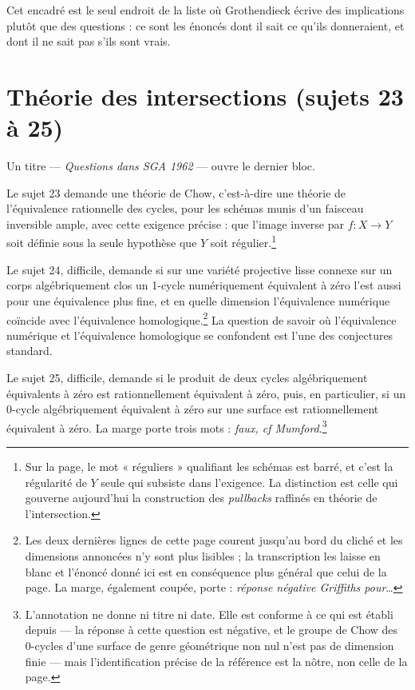 \documentclass[11pt,a4paper]{article}
\begin{document}
Cet encadré est le seul endroit de la liste où Grothendieck écrive des
implications plutôt que des questions : ce sont les énoncés dont il sait ce
qu'ils donneraient, et dont il ne sait pas s'ils sont vrais.

\section*{Théorie des intersections (sujets 23 à 25)}

Un titre --- \emph{Questions dans SGA 1962} --- ouvre le dernier bloc.

Le sujet 23 demande une théorie de Chow, c'est-à-dire une théorie de
l'équivalence rationnelle des cycles, pour les schémas munis d'un faisceau
inversible ample, avec cette exigence précise : que l'image inverse par
$f : X \to Y$ soit définie sous la seule hypothèse que $Y$ soit
régulier.\footnote{Sur la page, le mot « réguliers » qualifiant les schémas est
barré, et c'est la régularité de $Y$ seule qui subsiste dans l'exigence. La
distinction est celle qui gouverne aujourd'hui la construction des
\emph{pullbacks} raffinés en théorie de l'intersection.}

Le sujet 24, difficile, demande si sur une variété projective lisse connexe sur
un corps algébriquement clos un 1-cycle numériquement équivalent à zéro l'est
aussi pour une équivalence plus fine, et en quelle dimension l'équivalence
numérique coïncide avec l'équivalence homologique.\footnote{Les deux dernières
lignes de cette page courent jusqu'au bord du cliché et les dimensions
annoncées n'y sont plus lisibles ; la transcription les laisse en blanc et
l'énoncé donné ici est en conséquence plus général que celui de la page. La
marge, également coupée, porte : \emph{réponse négative Griffiths pour}\ldots}
La question de savoir où l'équivalence numérique et l'équivalence homologique
se confondent est l'une des conjectures standard.

Le sujet 25, difficile, demande si le produit de deux cycles algébriquement
équivalents à zéro est rationnellement équivalent à zéro, puis, en particulier,
si un 0-cycle algébriquement équivalent à zéro sur une surface est
rationnellement équivalent à zéro. La marge porte trois mots : \emph{faux, cf
Mumford}.\footnote{L'annotation ne donne ni titre ni date. Elle est conforme à
ce qui est établi depuis --- la réponse à cette question est négative, et le
groupe de Chow des 0-cycles d'une surface de genre géométrique non nul n'est pas
de dimension finie --- mais l'identification précise de la référence est la
nôtre, non celle de la page.}
\end{document}
